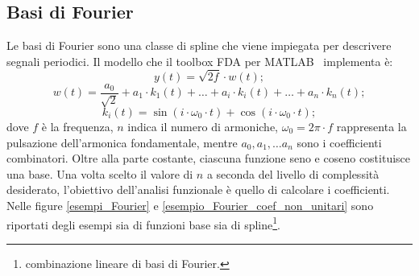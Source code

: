 \subsection[Basi di Fourier]{Basi di Fourier}
Le basi di Fourier sono una classe di spline che viene impiegata per descrivere segnali periodici. Il modello che il toolbox FDA per MATLAB~\cite{fda_toolbox} implementa è:
\begin{equation}
	y(t) = \sqrt{2f}\cdot w(t);
\end{equation}
\begin{equation}
	w(t) = \frac{a_0}{\sqrt{2}} + a_1\cdot k_1(t) +\dots + a_i\cdot k_i(t) + \dots + a_n\cdot k_n(t);
\end{equation}
\begin{equation}
	k_i(t) = \sin\left(i\cdot\omega_0\cdot t\right) + \cos\left(i\cdot\omega_0\cdot t\right);
\end{equation}
dove $f$ è la frequenza, $n$ indica il numero di armoniche, $\omega_0 = 2\pi\cdot f$ rappresenta la pulsazione dell'armonica fondamentale, mentre $a_0, a_1,\dots a_n$ sono i coefficienti combinatori. Oltre alla parte costante, ciascuna funzione seno e coseno costituisce una base. Una volta scelto il valore di $n$ a seconda del livello di complessità desiderato, l'obiettivo dell'analisi funzionale è quello di calcolare i coefficienti. Nelle figure \ref{esempi_Fourier} e \ref{esempio_Fourier_coef_non_unitari} sono riportati degli esempi sia di funzioni base sia di spline\footnote{combinazione lineare di basi di Fourier.}.

